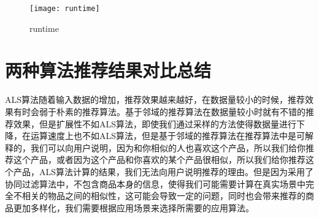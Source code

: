 \begin{figure}[ht]
\centering
\texttt{[image: runtime]}
\caption{runtime}\label{fig:runtime}
\end{figure}

\section{两种算法推荐结果对比总结}
ALS算法随着输入数据的增加，推荐效果越来越好，在数据量较小的时候，推荐效果有时会弱于朴素的推荐算法。基于邻域的推荐算法在数据量较小时就有不错的推荐效果，但是扩展性不如ALS算法，即使我们通过采样的方法使得数据量进行下降，在运算速度上也不如ALS算法，但是基于邻域的推荐算法在推荐算法中是可解释的，我们可以向用户说明，因为和你相似的人也喜欢这个产品，所以我们给你推荐这个产品，或者因为这个产品和你喜欢的某个产品很相似，所以我们给你推荐这个产品，ALS算法计算的结果，我们无法向用户说明推荐的理由。但是因为采用了协同过滤算法中，不包含商品本身的信息，使得我们可能需要计算在真实场景中完全不相关的物品之间的相似性，这可能会导致一定的问题，同时也会带来推荐的商品更加多样化，我们需要根据应用场景来选择所需要的应用算法。
